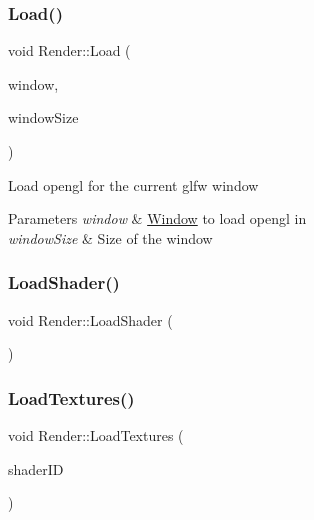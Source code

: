\subsubsection{\texorpdfstring{Load()}{Load()}}
{\footnotesize\ttfamily void Render\+::\+Load (\begin{DoxyParamCaption}\item[{G\+L\+F\+Wwindow $\ast$}]{window,  }\item[{glm\+::vec2}]{window\+Size }\end{DoxyParamCaption})}



Load opengl for the current glfw window 


\begin{DoxyParams}{Parameters}
{\em window} & \mbox{\hyperlink{class_window}{Window}} to load opengl in\\
\hline
{\em window\+Size} & Size of the window\\
\hline
\end{DoxyParams}
\mbox{\label{class_render_a96d8044246a4536a9957cde6ffadb3c2}} 
\subsubsection{\texorpdfstring{Load\+Shader()}{LoadShader()}}
{\footnotesize\ttfamily void Render\+::\+Load\+Shader (\begin{DoxyParamCaption}{ }\end{DoxyParamCaption})}

\mbox{\label{class_render_a7dc9ef9e079633a398019cfe85a57f5e}} 
\subsubsection{\texorpdfstring{Load\+Textures()}{LoadTextures()}}
{\footnotesize\ttfamily void Render\+::\+Load\+Textures (\begin{DoxyParamCaption}\item[{int}]{shader\+ID }\end{DoxyParamCaption})}

\mbox{\label{class_render_ad1297c066156b76188c2285b40fed537}} 
